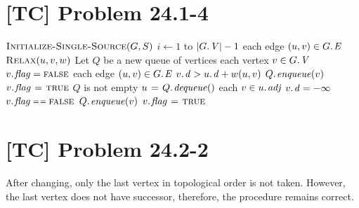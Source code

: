 \documentclass[a4paper,11pt,twocolumn]{article}
\newcommand{\FALSE}{\const{false}}
\newcommand{\TRUE}{\const{true}}
\begin{document}
  \section{[TC] Problem 24.1-4}
  \begin{codebox}
  \li $\textnormal{\scshape Initialize-Single-Source}(G,S)$
  \li \For $i \gets 1$ to $|\attrib{G}{V}|-1$
  \li \Do  \For each edge $(u, v) \in \attrib{G}{E}$
  \li      \Do  $\textnormal{\scshape Relax}(u, v, w)$
           \End
      \End
  \li Let $Q$ be a new queue of vertices
  \li \For each vertex $v \in \attrib{G}{V}$
  \li \Do  $\attrib{v}{flag} = \FALSE$
      \End
  \li \For each edge $(u, v) \in \attrib{G}{E}$
  \li \Do  \If $\attrib{v}{d} > \attrib{u}{d} + w(u, v)$
  \li      \Do $\attrib{Q}{enqueue}(v)$
  \li          $\attrib{v}{flag} \gets \TRUE$
           \End
      \End
  \li \While $Q$ is not empty
  \li \Do    $u \gets \attrib{Q}{dequeue}()$
  \li        \For each $v \in \attrib{u}{adj}$
  \li        \Do  $\attrib{v}{d} = -\infty$
  \li             \If $\attrib{v}{flag} \isequal \FALSE$
  \li             \Do $\attrib{Q}{enqueue}(v)$
  \li                 $\attrib{v}{flag} \gets \TRUE$
                  \End
             \End
      \End
  \end{codebox}

  \section{[TC] Problem 24.2-2}
  After changing, only the last vertex in topological order is not taken. However, the last vertex does not have successor, therefore, the procedure remains correct.
\end{document}
